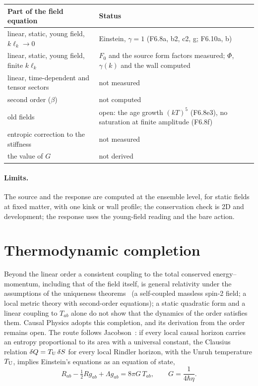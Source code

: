 \begin{center}
\begin{tabular}{p{}p{}}
\toprule
Part of the field equation & Status \\
\midrule
linear, static, young field, $k\ell_k\to0$ & Einstein, $\gamma=1$ (F6.8a, b2, c2, g; F6.10a, b) \\
linear, static, young field, finite $k\ell_k$ & $F_0$ and the source form factors measured; $\Phi$, $\gamma(k)$ and the wall computed \\
linear, time-dependent and tensor sectors & not measured \\
second order ($\beta$) & not computed \\
old fields & open: the age growth $(kT)^5$ (F6.8e3), no saturation at finite amplitude (F6.8f) \\
entropic correction to the stiffness & not measured \\
the value of $G$ & not derived \\
\bottomrule
\end{tabular}
\end{center}

\paragraph{Limits.} The source and the response are computed at the ensemble level, for static fields at fixed
matter, with one kink or wall profile; the conservation check is 2D and development; the response uses the
young-field reading and the bare action.

\section{Thermodynamic completion}\label{sec:jacobson}

Beyond the linear order a consistent coupling to the total conserved energy--momentum, including that of the
field itself, is general relativity under the assumptions of the uniqueness
theorems~\cite{Deser1970,FeynmanGravitation,Lovelock1971} (a self-coupled massless spin-2 field; a local metric
theory with second-order equations); a static quadratic form and a linear coupling to $T_{ab}$ alone do not show
that the dynamics of the order satisfies them. Causal Physics adopts this completion, and its derivation from the
order remains open. The route follows
Jacobson~\cite{Jacobson1995}: if every local causal horizon carries an entropy proportional to its area with a
universal constant, the Clausius relation $\delta Q=T_{\rm U}\,\delta S$ for every local Rindler horizon, with the Unruh
temperature $T_{\rm U}$, implies Einstein's equations as an equation of state,
\begin{equation}
  R_{ab}-\tfrac12Rg_{ab}+\Lambda g_{ab}=8\pi G\,T_{ab},\qquad G=\frac{1}{4\hbar\eta}.
\end{equation}

